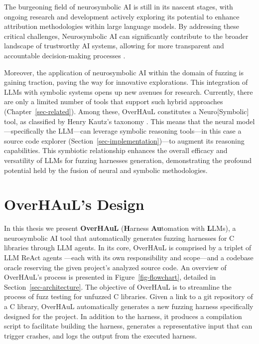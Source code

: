 \documentclass[
  a4paper,
]{scrreprt}
\theoremstyle{definition}
\theoremstyle{remark}
\begin{document}
The burgeoning field of neurosymbolic AI is still in its nascent stages,
with ongoing research and development actively exploring its potential
to enhance attribution methodologies within large language models. By
addressing these critical challenges, Neurosymbolic AI can significantly
contribute to the broader landscape of trustworthy AI systems, allowing
for more transparent and accountable decision-making processes
\autocite{sheth2023,gaur2023,tilwani2024}.

Moreover, the application of neurosymbolic AI within the domain of
fuzzing is gaining traction, paving the way for innovative explorations.
This integration of LLMs with symbolic systems opens up new avenues for
research. Currently, there are only a limited number of tools that
support such hybrid approaches (Chapter~\ref{sec-related}). Among these,
OverHAuL constitutes a Neuro{[}Symbolic{]} tool, as classified by Henry
Kautz's taxonomy \autocite{sarker2022,kautz2020}. This means that the
neural model---specifically the LLM---can leverage symbolic reasoning
tools---in this case a source code explorer
(Section~\ref{sec-implementation})---to augment its reasoning
capabilities. This symbiotic relationship enhances the overall efficacy
and versatility of LLMs for fuzzing harnesses generation, demonstrating
the profound potential held by the fusion of neural and symbolic
methodologies.


\chapter{OverHAuL's Design}\label{sec-overhaul}

In this thesis we present \textbf{OverHAuL} (\textbf{H}arness
\textbf{Au}tomation with \textbf{L}LMs), a neurosymbolic AI tool that
automatically generates fuzzing harnesses for C libraries through LLM
agents. In its core, OverHAuL is comprised by a triplet of LLM ReAct
agents \autocite{reAct}---each with its own responsibility and
scope---and a codebase oracle reserving the given project's analyzed
source code. An overview of OverHAuL's process is presented in
Figure~\ref{fig-flowchart}, detailed in Section~\ref{sec-architecture}.
The objective of OverHAuL is to streamline the process of fuzz testing
for unfuzzed C libraries. Given a link to a git repository
\autocite{torvalds2005} of a C library, OverHAuL automatically generates
a new fuzzing harness specifically designed for the project. In addition
to the harness, it produces a compilation script to facilitate building
the harness, generates a representative input that can trigger crashes,
and logs the output from the executed harness.
\end{document}
